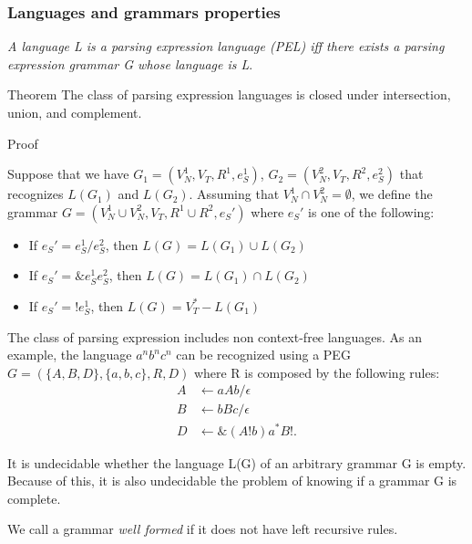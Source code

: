 \begin{frame}
	\small
	\frametitle{Languages and grammars properties}
	\begin{block}{}
		\emph{A language L is a parsing expression language (PEL) iff there exists a parsing expression grammar  G whose language is L}. 
	\end{block}
\begin{block}{Theorem}
	The class of parsing expression languages is closed under intersection, union, and complement.
\end{block}
\begin{block}{Proof}

Suppose that we  have $G_1 = (V_N^1,V_T, R^1,e_S^1)$, $G_2 = (V_N^2,V_T, R^2,e_S^2)$ that recognizes $L(G_1)$ and $L(G_2)$. Assuming that $V_N^1 \cap V_N^2 = \emptyset$, we define the grammar $G=(V_N^1 \cup V_N^2, V_T,R^1 \cup R^2, e_S')$ where $e_S'$ is one of the following:\begin{itemize}
	\item If $e_S' = e_S^1 / e_S^2$, then $L(G) = L(G_1) \cup L(G_2)$
	
	\item If $e_S' = \&e_S^1e_S^2$, then $L(G) = L(G_1) \cap L(G_2)$
	
	\item If $e_S' = !e_S^1$, then $L(G) = V_T^* - L(G_1)$
\end{itemize}
	
\end{block}
\end{frame}

\begin{frame}

	\small
	

	\begin{block}{}
	The class of parsing expression  includes non context-free languages. As an example, the language $a^nb^nc^n$ can be recognized using a PEG $G = (\{A,B,D\},\{a,b,c\},R,D)$ where R is composed by the following rules:
	\begin{align*}
		A  &\leftarrow  a A b / \epsilon \\
		B &\leftarrow bBc / \epsilon \\
		D &\leftarrow\&(A !b)a^*B!.
	\end{align*}
	\end{block}
		\begin{block}{}
		It is undecidable whether the language L(G) of an arbitrary grammar G is empty. Because of this, it is also undecidable the problem of knowing if a grammar G is complete.
	\end{block}
	\begin{block}{}
		We call a grammar \emph{well formed} if it does not have left recursive rules.
	\end{block}
\end{frame}


